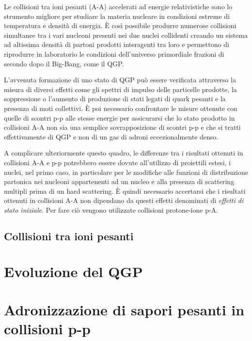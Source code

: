Le collisioni tra ioni pesanti (A-A) accelerati ad energie relativistiche sono lo strumento migliore per studiare la materia nucleare in condizioni estreme di temperatura e densità di energia. È così possibile produrre numerose collisioni simultanee tra i vari nucleoni presenti nei due nuclei collidenti creando un sistema ad altissima densità di partoni prodotti interagenti tra loro e permettono di riprodurre in laboratorio le condizioni dell'universo primordiale frazioni di secondo dopo il Big-Bang, come il QGP.

L'avvenuta formazione di uno stato di QGP può essere verificata attraverso la misura di diversi effetti come gli spettri di impulso delle particelle prodotte, la soppressione o l'aumento di produzione di stati legati di quark pesanti e la presenza di moti collettivi. È poi necessario confrontare le misure ottenute con quelle di scontri p-p alle stesse energie per assicurarsi che lo stato prodotto in collisioni A-A non sia una semplice sovrapposizione di scontri p-p e che si tratti effettivamente di QGP e non di un gas di adroni eccezionalmente denso.

A complicare ulteriormente questo quadro, le differenze tra i risultati ottenuti in collisioni A-A e p-p potrebbero essere dovute all'utilizzo di proiettili estesi, i nuclei, nel primo caso, in particolare per le modifiche alle funzioni di distribuzione partonica nei nucleoni appartenenti ad un nucleo e alla presenza di scattering multipli prima di un hard scattering. È quindi necessario accertarsi che i risultati ottenuti in collisioni A-A non dipendano da questi effetti denominati di \textit{effetti di stato iniziale}. Per fare ciò vengono utilizzate collisioni protone-ione p-A.


    \subsection{Collisioni tra ioni pesanti}
        
\newpage

\section{Evoluzione del QGP}

\section{Adronizzazione di sapori pesanti in collisioni p-p}

